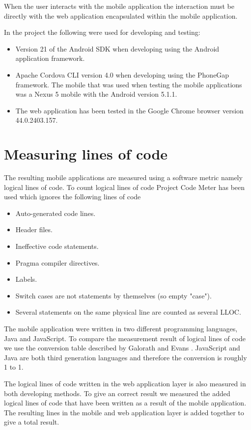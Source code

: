 When the user interacts with the mobile application the interaction must be directly with the web application encapsulated within the mobile application. 

In the project the following were used for developing and testing:
\begin{itemize}
\item Version 21 of the Android SDK when developing using the Android application framework.
\item Apache Cordova CLI version 4.0 when developing using the PhoneGap framework. 
The mobile that was used when testing the mobile applications was a Nexus 5 mobile with the Android version 5.1.1.
\item The web application has been tested in the Google Chrome browser version 44.0.2403.157.
\end{itemize}

\section{Measuring lines of code}\label{section-measuring-lines-of-code}
The resulting mobile applications are measured using a software metric namely logical lines of code. To count logical lines of code Project Code Meter has been used which ignores the following lines of code \cite{project-code-meter2015}

\begin{itemize}
\item Auto-generated code lines.
\item Header files.
\item Ineffective code statements.
\item Pragma compiler directives.
\item Labels.
\item Switch cases are not statements by themselves (so empty "case").
\item Several statements on the same physical line are counted as several LLOC.
\end{itemize}

The mobile application were written in two different programming languages, Java and JavaScript. To compare the measurement result of logical lines of code we use the conversion table described by Galorath and Evans \cite[p.~163]{galorath2006}. JavaScript and Java are both third generation languages and therefore the conversion is roughly 1 to 1. 

The logical lines of code written in the web application layer is also measured in both developing methods. To give an correct result we measured the added logical lines of code that have been written as a result of the mobile application. The resulting lines in the mobile and web application layer is added together to give a total result. 

